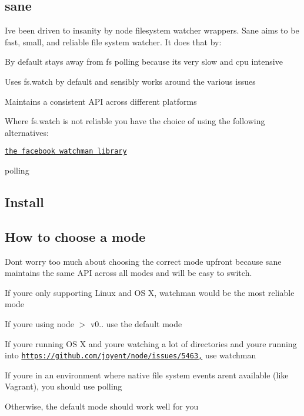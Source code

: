 \href{https://circleci.com/gh/amasad/sane}{\tt }

\subsection*{sane }

I\textquotesingle{}ve been driven to insanity by node filesystem watcher wrappers. Sane aims to be fast, small, and reliable file system watcher. It does that by\+:


\begin{DoxyItemize}
\item By default stays away from fs polling because it\textquotesingle{}s very slow and cpu intensive
\item Uses {\ttfamily fs.\+watch} by default and sensibly works around the various issues
\item Maintains a consistent A\+PI across different platforms
\item Where {\ttfamily fs.\+watch} is not reliable you have the choice of using the following alternatives\+:
\begin{DoxyItemize}
\item \href{https://facebook.github.io/watchman/}{\tt the facebook watchman library}
\item polling
\end{DoxyItemize}
\end{DoxyItemize}

\subsection*{Install}




\subsection*{How to choose a mode}

Don\textquotesingle{}t worry too much about choosing the correct mode upfront because sane maintains the same A\+PI across all modes and will be easy to switch.


\begin{DoxyItemize}
\item If you\textquotesingle{}re only supporting Linux and OS X, {\ttfamily watchman} would be the most reliable mode
\item If you\textquotesingle{}re using node $>$ v0.. use the default mode
\item If you\textquotesingle{}re running OS X and you\textquotesingle{}re watching a lot of directories and you\textquotesingle{}re running into \href{https://github.com/joyent/node/issues/5463,}{\tt https\+://github.\+com/joyent/node/issues/5463,} use {\ttfamily watchman}
\item If you\textquotesingle{}re in an environment where native file system events aren\textquotesingle{}t available (like Vagrant), you should use polling
\item Otherwise, the default mode should work well for you
\end{DoxyItemize}

